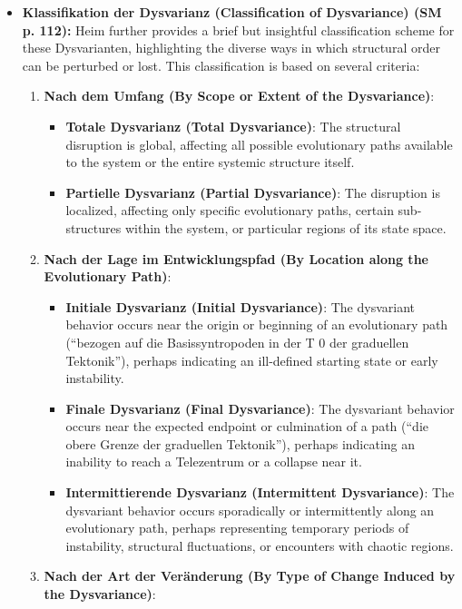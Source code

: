 \documentclass[12pt]{article}
\newcommand{\q}[1]{\enquote{#1}}
\begin{document}
\begin{itemize}
    \item \textbf{Klassifikation der Dysvarianz (Classification of Dysvariance) (SM p. 112):}
    Heim further provides a brief but insightful classification scheme for these Dysvarianten, highlighting the diverse ways in which structural order can be perturbed or lost. This classification is based on several criteria:
    \begin{enumerate}
        \item \textbf{Nach dem Umfang (By Scope or Extent of the Dysvariance)}:
        \begin{itemize}
            \item \textbf{Totale Dysvarianz (Total Dysvariance)}: The structural disruption is global, affecting all possible evolutionary paths available to the system or the entire systemic structure itself.
            \item \textbf{Partielle Dysvarianz (Partial Dysvariance)}: The disruption is localized, affecting only specific evolutionary paths, certain sub-structures within the system, or particular regions of its state space.
        \end{itemize}
        \item \textbf{Nach der Lage im Entwicklungspfad (By Location along the Evolutionary Path)}:
        \begin{itemize}
            \item \textbf{Initiale Dysvarianz (Initial Dysvariance)}: The dysvariant behavior occurs near the origin or beginning of an evolutionary path (\q{bezogen auf die Basissyntropoden in der T 0 der graduellen Tektonik}), perhaps indicating an ill-defined starting state or early instability.
            \item \textbf{Finale Dysvarianz (Final Dysvariance)}: The dysvariant behavior occurs near the expected endpoint or culmination of a path (\q{die obere Grenze der graduellen Tektonik}), perhaps indicating an inability to reach a Telezentrum or a collapse near it.
            \item \textbf{Intermittierende Dysvarianz (Intermittent Dysvariance)}: The dysvariant behavior occurs sporadically or intermittently along an evolutionary path, perhaps representing temporary periods of instability, structural fluctuations, or encounters with chaotic regions.
        \end{itemize}
        \item \textbf{Nach der Art der Veränderung (By Type of Change Induced by the Dysvariance)}:
        \begin{itemize}

\end{itemize}
\end{enumerate}
\end{itemize}
\end{document}
